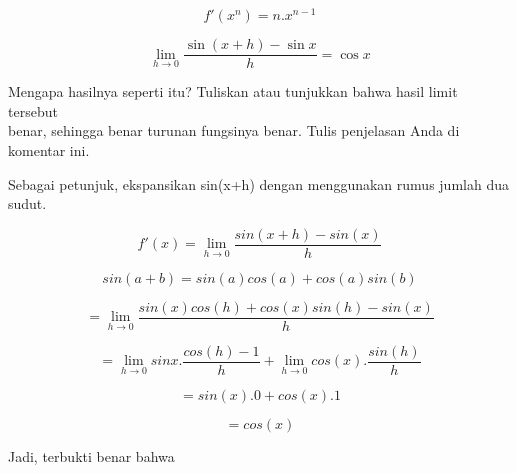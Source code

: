 \documentclass{article}
\begin{document}
\begin{eulernotebook}
\begin{eulercomment}
\begin{eulercomment}
\begin{eulercomment}
\begin{eulercomment}
\begin{eulercomment}
\begin{eulercomment}
\begin{eulerformula}
\[
f'(x^n) = n.x^{n-1}
\]
\end{eulerformula}
\begin{eulercomment}
\end{eulercomment}
\begin{eulerformula}
\[
\lim_{h\rightarrow 0}{\frac{\sin \left(x+h\right)-\sin x}{h}}=\cos   x
\]
\end{eulerformula}
\begin{eulercomment}
Mengapa hasilnya seperti itu? Tuliskan atau tunjukkan bahwa hasil
limit tersebut\\
benar, sehingga benar turunan fungsinya benar.  Tulis penjelasan Anda
di komentar ini.

Sebagai petunjuk, ekspansikan sin(x+h) dengan menggunakan rumus jumlah
dua sudut.

\end{eulercomment}
\begin{eulercomment}
\end{eulercomment}
\begin{eulerformula}
\[
f'(x) = \lim_{h\to 0} \frac{sin(x+h)-sin(x)}{h}
\]
\end{eulerformula}
\begin{eulercomment}
\end{eulercomment}
\begin{eulerformula}
\[
sin(a+b)=sin(a)cos(a)+cos(a)sin(b)
\]
\end{eulerformula}
\begin{eulercomment}
\end{eulercomment}
\begin{eulerformula}
\[
= \lim_{h\to 0} \frac{sin(x)cos(h)+cos(x)sin(h)-sin(x)}{h}
\]
\end{eulerformula}
\begin{eulercomment}
\end{eulercomment}
\begin{eulerformula}
\[
= \lim_{h\to 0} sinx.\frac{cos(h)-1}{h}+\lim_{h\to 0} cos(x).\frac{sin(h)}{h}
\]
\end{eulerformula}
\begin{eulerformula}
\[
= sin(x).0+cos(x).1
\]
\end{eulerformula}
\begin{eulercomment}
\end{eulercomment}
\begin{eulerformula}
\[
= cos(x)
\]
\end{eulerformula}
\begin{eulercomment}
Jadi, terbukti benar bahwa


\end{eulercomment}
\end{eulercomment}
\end{eulercomment}
\end{eulercomment}
\end{eulercomment}
\end{eulercomment}
\end{eulercomment}
\end{eulernotebook}
\end{document}
